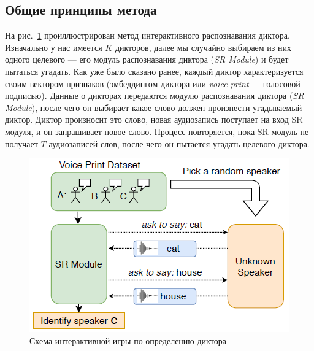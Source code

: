 \subsection{Общие принципы метода}\label{ssec:isr}

На рис.~\ref{fig:isr} проиллюстрирован метод интерактивного распознавания
диктора. Изначально у нас имеется $K$ дикторов, далее мы случайно выбираем
из них одного целевого --- его модуль распознавания диктора
(\textit{SR Module}) и будет пытаться угадать. Как уже было сказано ранее,
каждый диктор характеризуется своим вектором признаков (эмбеддингом диктора
или \textit{voice print} --- голосовой подписью). Данные о дикторах передаются
модулю распознавания диктора (\textit{SR Module}), после чего он выбирает
какое слово должен произнести угадываемый диктор. Диктор произносит это слово,
новая аудиозапись поступает на вход SR модуля, и он запрашивает новое слово.
Процесс повторяется, пока SR модуль не получает $T$ аудиозаписей слов, после
чего он пытается угадать целевого диктора.

\begin{figure}[hbt]
    \centering
    \includegraphics[scale=1.0]{figures/isr_game.png}
    \caption{Схема интерактивной игры по определению диктора \citeisr}
    \label{fig:isr}
\end{figure}

